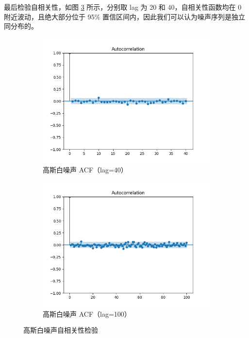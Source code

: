 最后检验自相关性，如图 \ref{fig:gaussian_acf} 所示，分别取 lag 为 20 和 40，自相关性函数均在 0 附近波动，且绝大部分位于 95\% 置信区间内，因此我们可以认为噪声序列是独立同分布的。


\begin{figure}[ht]
    \centering
    \begin{subfigure}[b]{0.48\textwidth}
        \centering
        \includegraphics[width=\textwidth]{static/gaussian_acf_40.png}
        \caption{
            高斯白噪声 ACF（lag=40）
        }\label{fig:gaussian_acf_40}
    \end{subfigure}
    \hfill
    \begin{subfigure}[b]{0.48\textwidth}
        \centering
        \includegraphics[width=\textwidth]{static/gaussian_acf_100.png}
        \caption{
            高斯白噪声 ACF（lag=100）
        }\label{fig:gaussian_acf_100}
    \end{subfigure}
    \caption{
        高斯白噪声自相关性检验
    }\label{fig:gaussian_acf}
\end{figure}


